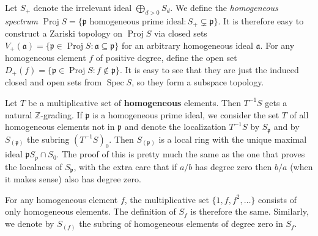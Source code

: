 \documentclass[12pt]{article}
\theoremstyle{remark}
\newcommand{\Z}[0]{\mathbb{Z}}
\newcommand{\Spec}[0]{\operatorname{Spec}}
\newcommand{\Proj}[0]{\operatorname{Proj}}
\begin{document}
	Let $S_+$ denote the irrelevant ideal $\bigoplus_{d>0} S_d$. We define the \textit{homogeneous spectrum} $\Proj S=\{\mathfrak p\text{ homogeneous prime ideal}:S_+\subsetneq \mathfrak p\}$. It is therefore easy to construct a Zariski topology on $\Proj S$ via closed sets $V_+(\mathfrak a)=\{\mathfrak p\in\Proj S:\mathfrak a\subseteq\mathfrak p\}$ for an arbitrary homogeneous ideal $\mathfrak a$. For any homogeneous element $f$ of positive degree, define the open set $D_+(f)=\{\mathfrak p\in\Proj S:f\notin\mathfrak p\}$. It is easy to see that they are just the induced closed and open sets from $\Spec S$, so they form a subspace topology.

	Let $T$ be a multiplicative set of \textbf{homogeneous} elements. Then $T^{-1}S$ gets a natural $\Z$-grading. If $\mathfrak p$ is a homogeneous prime ideal, we consider the set $T$ of all homogeneous elements not in $\mathfrak p$ and denote the localization $T^{-1}S$ by $S_{\mathfrak p}$ and by $S_{(\mathfrak p)}$ the subring $(T^{-1}S)_0$. Then $S_{(\mathfrak p)}$ is a local ring with the unique maximal ideal $\mathfrak pS_p\cap S_0$. The proof of this is pretty much the same as the one that proves the localness of $S_{\mathfrak p}$, with the extra care that if $a/b$ has degree zero then $b/a$ (when it makes sense) also has degree zero.

	For any homogeneous element $f$, the multiplicative set $\{1, f, f^2,\dots\}$ consists of only homogeneous elements. The definition of $S_f$ is therefore the same. Similarly, we denote by $S_{(f)}$ the subring of homogeneous elements of degree zero in $S_f$.
\end{document}
